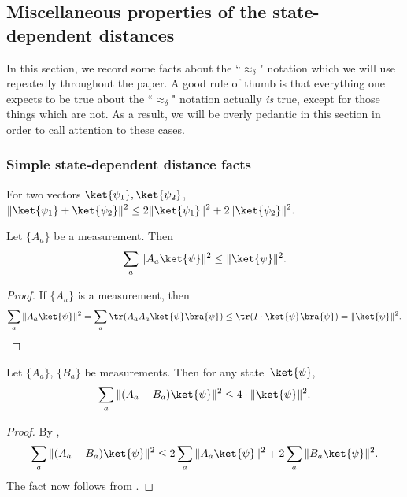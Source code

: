 \subsection{Miscellaneous properties of the state-dependent distances}

In this section, we record some facts about the ``$\approx_\delta$" notation which we will use repeatedly throughout the paper.
A good rule of thumb is that everything one expects to be true about the ``$\approx_\delta$" notation actually \emph{is}  true,
except for those things which are not. 
As a result, we will be overly pedantic in this section in order to call attention to these cases.

\subsubsection{Simple state-dependent distance facts}

\begin{fact}\label{fact:obvious-vector-fact}
For two vectors $\ket{\psi_1}, \ket{\psi_2}$, 
$\displaystyle
\Vert \ket{\psi_1} + \ket{\psi_2} \Vert^2 \leq 2 \Vert \ket{\psi_1} \Vert^2 + 2 \Vert \ket{\psi_2} \Vert^2.
$
\end{fact}

\begin{fact}\label{fact:measurement-sub-measurement-switcheroo}
Let $\{A_a\}$ be a measurement. Then
\begin{equation*}
\sum_a \Vert A_{a} \ket{\psi}\Vert^2 \leq\Vert \ket{\psi} \Vert^2.
\end{equation*}
\end{fact}
\begin{proof}
If $\{A_a\}$ is a measurement, then
\begin{equation*}
\sum_a \Vert A_{a} \ket{\psi}\Vert^2
= \sum_a \tr( A_a A_{a} \ket{\psi}\bra{\psi})
\leq \tr(I \cdot \ket{\psi}\bra{\psi}) = \Vert \ket{\psi}\Vert^2.\qedhere
\end{equation*}
\end{proof}

\begin{fact}\label{fact:easy-bound}
Let $\{A_a\}$, $\{B_a\}$ be measurements. Then for any state~$\ket{\psi}$,
\begin{equation*}
\sum_a \Vert (A_{a} - B_{a} ) \ket{\psi}\Vert^2 \leq 4 \cdot \Vert \ket{\psi} \Vert^2.
\end{equation*}
\end{fact}
\begin{proof}
By ,
\begin{equation*}
\sum_a \Vert (A_{a} - B_{a} ) \ket{\psi}\Vert^2 \leq 2 \sum_a \Vert A_{a} \ket{\psi}\Vert^2 + 2 \sum_a \Vert  B_{a} \ket{\psi}\Vert^2.
\end{equation*}
The fact now follows from .
\end{proof}

